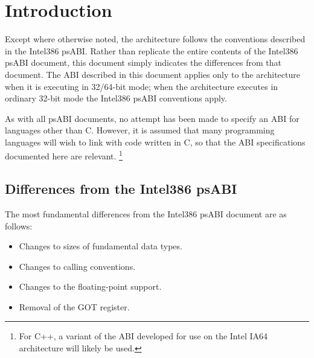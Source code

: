 \chapter{Introduction}

Except where otherwise noted, the \xARCH architecture follows the
conventions described in the Intel386 psABI.  Rather than replicate
the entire contents of the Intel386 psABI document, this document
simply indicates the differences from that document.  The ABI
described in this document applies only to the \xARCH architecture
when it is executing in 32/64-bit mode; when the architecture executes
in ordinary 32-bit mode the Intel386 psABI conventions apply.

As with all psABI documents, no attempt has been made to specify an
ABI for languages other than C.  However, it is assumed that many
programming languages will wish to link with code written in C, so
that the ABI specifications documented here are relevant.%
\footnote{For C++, a variant of the ABI developed for use on the Intel
  IA64 architecture will likely be used.}

\section{Differences from the Intel386 psABI}

The most fundamental differences from the Intel386 psABI document
are as follows:
\begin{itemize}
\item Changes to sizes of fundamental data types.
\item Changes to calling conventions.
\item Changes to the floating-point support.
\item Removal of the GOT register.
\end{itemize}

